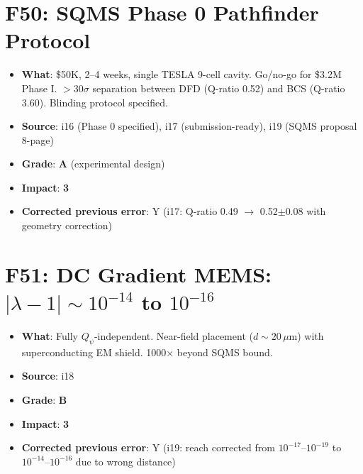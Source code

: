 \documentclass[11pt,a4paper]{article}
\newcommand{\grade}[1]{\textbf{#1}}
\newcommand{\impact}[1]{\textbf{#1}}
\begin{document}
\section{F50: SQMS Phase 0 Pathfinder Protocol}
\begin{itemize}[nosep]
\item \textbf{What}: \$50K, 2--4 weeks, single TESLA 9-cell cavity. Go/no-go for \$3.2M Phase I. $>30\sigma$ separation between DFD (Q-ratio 0.52) and BCS (Q-ratio 3.60). Blinding protocol specified.
\item \textbf{Source}: i16 (Phase 0 specified), i17 (submission-ready), i19 (SQMS proposal 8-page)
\item \textbf{Grade}: \grade{A} (experimental design)
\item \textbf{Impact}: \impact{3}
\item \textbf{Corrected previous error}: Y (i17: Q-ratio 0.49 $\to$ 0.52$\pm$0.08 with geometry correction)
\end{itemize}

\section{F51: DC Gradient MEMS: $|\lambda-1| \sim 10^{-14}$ to $10^{-16}$}
\begin{itemize}[nosep]
\item \textbf{What}: Fully $Q_\psi$-independent. Near-field placement ($d \sim 20\,\mu$m) with superconducting EM shield. 1000$\times$ beyond SQMS bound.
\item \textbf{Source}: i18
\item \textbf{Grade}: \grade{B}
\item \textbf{Impact}: \impact{3}
\item \textbf{Corrected previous error}: Y (i19: reach corrected from $10^{-17}$--$10^{-19}$ to $10^{-14}$--$10^{-16}$ due to wrong distance)
\end{itemize}

\end{document}
